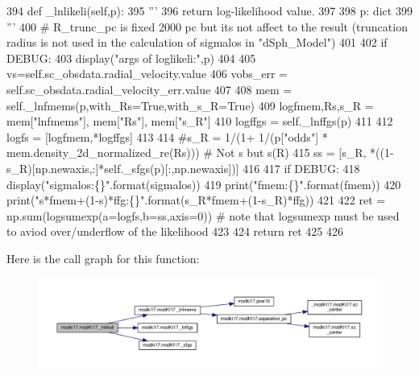 \begin{DoxyCode}
394     \textcolor{keyword}{def }\_lnlikeli(self,p): 
395         \textcolor{stringliteral}{'''}
396 \textcolor{stringliteral}{        return log-likelihood value.}
397 \textcolor{stringliteral}{        }
398 \textcolor{stringliteral}{        p: dict}
399 \textcolor{stringliteral}{        '''}
400         \textcolor{comment}{# R\_trunc\_pc is fixed 2000 pc but its not affect to the result (truncation radius is not used in
       the calculation of sigmalos in "dSph\_Model")}
401 
402         \textcolor{keywordflow}{if} DEBUG:
403             display(\textcolor{stringliteral}{"args of loglikeli:"},p)
404         
405         vs=self.sc\_obsdata.radial\_velocity.value
406         vobs\_err = self.sc\_obsdata.radial\_velocity\_err.value
407         
408         mem = self.\_lnfmems(p,with\_Rs=\textcolor{keyword}{True},with\_s\_R=\textcolor{keyword}{True})
409         logfmem,Rs,s\_R = mem[\textcolor{stringliteral}{"lnfmems"}], mem[\textcolor{stringliteral}{"Rs"}], mem[\textcolor{stringliteral}{"s\_R"}]
410         logffgs = self.\_lnffgs(p)
411         
412         logfs = [logfmem,*logffgs]
413         
414         \textcolor{comment}{#s\_R = 1/(1+ 1/(p["odds"] * mem.density\_2d\_normalized\_re(Rs))) # Not s but s(R)}
415         ss = [s\_R, *((1-s\_R)[np.newaxis,:]*self.\_sfgs(p)[:,np.newaxis])]
416         
417         \textcolor{keywordflow}{if} DEBUG:
418             display(\textcolor{stringliteral}{"sigmalos:\{\}"}.format(sigmalos))
419             print(\textcolor{stringliteral}{"fmem:\{\}"}.format(fmem))
420             print(\textcolor{stringliteral}{"s*fmem+(1-s)*ffg:\{\}"}.format(s\_R*fmem+(1-s\_R)*ffg))
421         
422         ret = np.sum(logsumexp(a=logfs,b=ss,axis=0)) \textcolor{comment}{# note that logsumexp must be used to aviod
       over/underflow of the likelihood}
423         
424         \textcolor{keywordflow}{return} ret
425 
426     
\end{DoxyCode}
Here is the call graph for this function\+:\nopagebreak
\begin{figure}[H]
\begin{center}
\leavevmode
\includegraphics[width=350pt]{df/da3/classmodki17_1_1modKI17_a54b0d8abd39c0ab4c04cb1e52eafe9c5_cgraph}
\end{center}
\end{figure}
